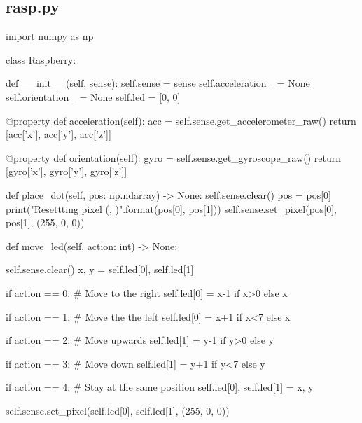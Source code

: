 \subsection{rasp.py}
\label{rasp_code}
\begin{pyverbatim}
import numpy as np


class Raspberry:

    def __init__(self, sense):
        self.sense = sense
        self.acceleration_ = None
        self.orientation_ = None
        self.led = [0, 0]

    @property
    def acceleration(self):
        acc = self.sense.get_accelerometer_raw()
        return [acc['x'], acc['y'], acc['z']]

    @property
    def orientation(self):
        gyro = self.sense.get_gyroscope_raw()
        return [gyro['x'], gyro['y'], gyro['z']]

    def place_dot(self, pos: np.ndarray) -> None:
        self.sense.clear()
        pos = pos[0]
        print("Resettting pixel ({}, {})".format(pos[0], pos[1]))
        self.sense.set_pixel(pos[0], pos[1], (255, 0, 0))

    def move_led(self, action: int) -> None:

        self.sense.clear()
        x, y = self.led[0], self.led[1]

        if action == 0:  # Move to the right
            self.led[0] = x-1 if x>0 else x

        if action == 1:  # Move the the left
            self.led[0] = x+1 if x<7 else x

        if action == 2:  # Move upwards
            self.led[1] = y-1 if y>0 else y

        if action == 3:  # Move down
            self.led[1] = y+1 if y<7 else y
        
        if action == 4:  # Stay at the same position
            self.led[0], self.led[1] = x, y
        
        self.sense.set_pixel(self.led[0], self.led[1], (255, 0, 0))

\end{pyverbatim}




